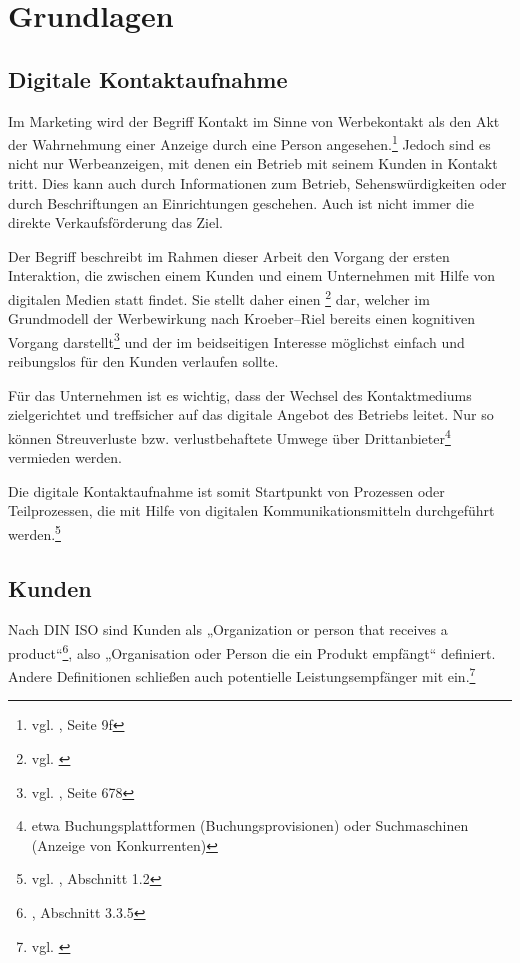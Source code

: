 
\section{Grundlagen} %
\label{sec:grundlagen}

\subsection{Digitale Kontaktaufnahme} %
\label{sub:digitale_kontaktaufnahme}

Im Marketing wird der Begriff Kontakt im Sinne von Werbekontakt als den Akt der Wahrnehmung einer Anzeige durch eine Person angesehen.\footnote{vgl. \cite{dannenberg}, Seite 9f} Jedoch sind es nicht nur Werbeanzeigen, mit denen ein Betrieb mit seinem Kunden in Kontakt tritt. Dies kann auch durch Informationen zum Betrieb, Sehenswürdigkeiten oder durch Beschriftungen an Einrichtungen geschehen. Auch ist nicht immer die direkte Verkaufsförderung das Ziel.

Der Begriff  beschreibt im Rahmen dieser Arbeit den Vorgang der ersten Interaktion, die zwischen einem Kunden und einem Unternehmen mit Hilfe von digitalen Medien statt findet. Sie stellt daher einen \footnote{vgl. \cite{gabler:medienbruch}} dar, welcher im Grundmodell der Werbewirkung nach Kroeber–Riel bereits einen kognitiven Vorgang darstellt\footnote{vgl. \cite{kroeber-riel}, Seite 678} und der im beidseitigen Interesse möglichst einfach und reibungslos für den Kunden verlaufen sollte. 

Für das Unternehmen ist es wichtig, dass der Wechsel des Kontaktmediums zielgerichtet und treffsicher auf das digitale Angebot des Betriebs leitet. Nur so können Streuverluste bzw. verlustbehaftete Umwege über Drittanbieter\footnote{etwa Buchungsplattformen (Buchungsprovisionen) oder Suchmaschinen (Anzeige von Konkurrenten)} vermieden werden.

Die digitale Kontaktaufnahme ist somit Startpunkt von Prozessen oder Teilprozessen, die mit Hilfe von digitalen Kommunikationsmitteln durchgeführt werden.\footnote{vgl. \cite{magal}, Abschnitt 1.2}

\subsection{Kunden} %
\label{sub:kunden}
Nach DIN ISO sind Kunden als „Organization or person that receives a product“\footnote{\cite{iso:kunde}, Abschnitt 3.3.5}, also „Organisation oder Person die ein Produkt empfängt“ definiert. Andere Definitionen schließen auch potentielle Leistungsempfänger mit ein.\footnote{vgl. \cite{gabler:kunde}}

